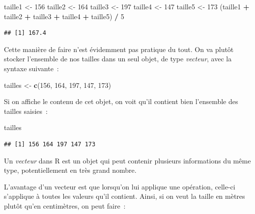 \documentclass[12pt,]{book}
\newenvironment{Shaded}{\begin{snugshade}}{\end{snugshade}}
\newcommand{\DecValTok}[1]{\textcolor[rgb]{0.06,0.06,0.06}{#1}}
\newcommand{\KeywordTok}[1]{\textcolor[rgb]{0.27,0.27,0.27}{\textbf{#1}}}
\newcommand{\NormalTok}[1]{#1}
\newcommand{\OperatorTok}[1]{\textcolor[rgb]{0.43,0.43,0.43}{\textbf{#1}}}
\newcommand{\StringTok}[1]{\textcolor[rgb]{0.5,0.5,0.5}{#1}}
\begin{document}
\begin{Shaded}
\begin{Highlighting}[]
\NormalTok{taille1 <-}\StringTok{ }\DecValTok{156}
\NormalTok{taille2 <-}\StringTok{ }\DecValTok{164}
\NormalTok{taille3 <-}\StringTok{ }\DecValTok{197}
\NormalTok{taille4 <-}\StringTok{ }\DecValTok{147}
\NormalTok{taille5 <-}\StringTok{ }\DecValTok{173}
\NormalTok{(taille1 }\OperatorTok{+}\StringTok{ }\NormalTok{taille2 }\OperatorTok{+}\StringTok{ }\NormalTok{taille3 }\OperatorTok{+}\StringTok{ }\NormalTok{taille4 }\OperatorTok{+}\StringTok{ }\NormalTok{taille5) }\OperatorTok{/}\StringTok{ }\DecValTok{5}
\end{Highlighting}
\end{Shaded}

\begin{verbatim}
## [1] 167.4
\end{verbatim}

Cette manière de faire n'est évidemment pas pratique du tout. On va plutôt stocker l'ensemble de nos tailles dans un seul objet, de type \emph{vecteur}, avec la syntaxe suivante~:

\begin{Shaded}
\begin{Highlighting}[]
\NormalTok{tailles <-}\StringTok{ }\KeywordTok{c}\NormalTok{(}\DecValTok{156}\NormalTok{, }\DecValTok{164}\NormalTok{, }\DecValTok{197}\NormalTok{, }\DecValTok{147}\NormalTok{, }\DecValTok{173}\NormalTok{)}
\end{Highlighting}
\end{Shaded}

Si on affiche le contenu de cet objet, on voit qu'il contient bien l'ensemble des tailles saisies~:

\begin{Shaded}
\begin{Highlighting}[]
\NormalTok{tailles}
\end{Highlighting}
\end{Shaded}

\begin{verbatim}
## [1] 156 164 197 147 173
\end{verbatim}

Un \emph{vecteur} dans R est un objet qui peut contenir plusieurs informations du même type, potentiellement en très grand nombre.

L'avantage d'un vecteur est que lorsqu'on lui applique une opération, celle-ci s'applique à toutes les valeurs qu'il contient. Ainsi, si on veut la taille en mètres plutôt qu'en centimètres, on peut faire~:
\end{document}
